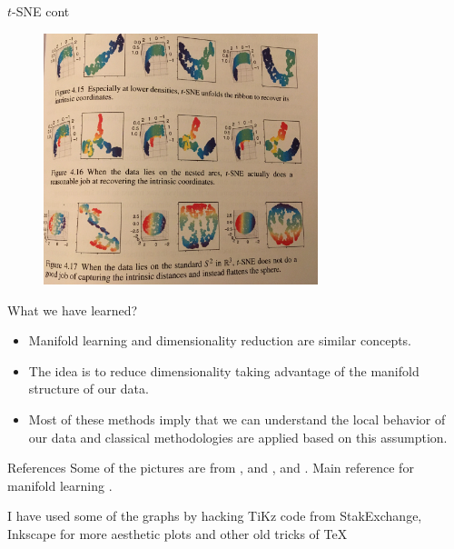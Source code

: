 \documentclass{beamer}
\begin{document}
\begin{frame}{$t$-SNE cont}
	\begin{figure}[h]
		\centering
		\includegraphics[width=8cm]{../../Figures/fig_manifolde_4_17.jpg}
	\end{figure}				
	
\end{frame}


\begin{frame}{What we have learned?	}
	\begin{itemize}
		\item Manifold learning and dimensionality reduction are similar concepts.
		\item The idea is to reduce dimensionality taking advantage of the manifold structure of our data. 
		\item Most of these methods imply that we can understand the local behavior of our data and classical methodologies are applied based on this assumption.
	\end{itemize}
\end{frame}



\begin{frame}{References}
	Some of the pictures are from \citep{docarmoriemann}, and \citep{schutz}, and \citep{geron2}. Main reference for manifold learning \citep{rabadan}.
	\printbibliography 	
	
	I have used some of the graphs by hacking TiKz code from StakExchange, Inkscape for more aesthetic plots and other old tricks of \TeX
	
\end{frame}


	
\end{document}
